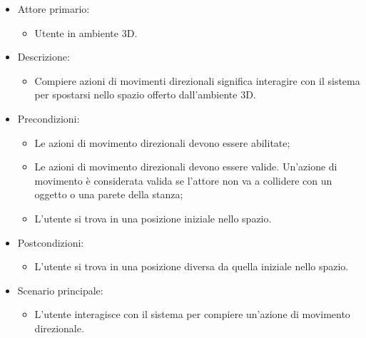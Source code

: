 \begin{itemize}

	\item Attore primario: 
	\begin{itemize}
		\item Utente in ambiente 3D.
	\end{itemize}
	\item Descrizione:
	\begin{itemize}
		\item Compiere azioni di movimenti direzionali significa interagire con il sistema per spostarsi nello spazio offerto dall'ambiente 3D.
	\end{itemize}
	
	\item Precondizioni:
	\begin{itemize}
		\item Le azioni di movimento direzionali devono essere abilitate;
		\item Le azioni di movimento direzionali devono essere valide. Un'azione di movimento è considerata valida se l'attore non va a collidere con un oggetto o una parete della stanza;
		\item L'utente si trova in una posizione iniziale nello spazio.
	\end{itemize}
	
	\item Postcondizioni:
	\begin{itemize}
		\item L'utente si trova in una posizione diversa da quella iniziale nello spazio.
	\end{itemize}
	
	\item Scenario principale:
	\begin{itemize}
		\item L'utente interagisce con il sistema per compiere un'azione di movimento direzionale.
	\end{itemize}
	
\end{itemize}


